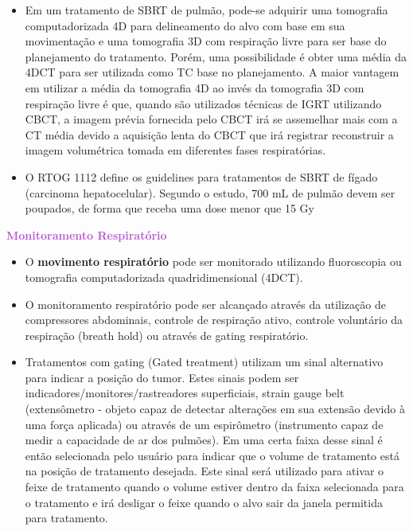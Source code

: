 \documentclass[11pt,a4paper]{article}
\newcounter{exemplo}
\begin{document}
\begin{exemplo}
\begin{itemize}
        \item Em um tratamento de SBRT de pulmão, pode-se adquirir uma tomografia computadorizada 4D para delineamento do alvo com base em sua movimentação e uma tomografia 3D com respiração livre para ser base do planejamento do tratamento. Porém, uma possibilidade é obter uma média da 4DCT para ser utilizada como TC base no planejamento. A maior vantagem em utilizar a média da tomografia 4D ao invés da tomografia 3D com respiração livre é que, quando são utilizados técnicas de IGRT utilizando CBCT, a imagem prévia fornecida pelo CBCT irá se assemelhar mais com a CT média devido a aquisição lenta do CBCT que irá registrar reconstruir a imagem volumétrica tomada em diferentes fases respiratórias.
        
        \item O RTOG 1112 define os guidelines para tratamentos de SBRT de fígado (carcinoma hepatocelular). Segundo o estudo, 700 mL de pulmão devem ser poupados, de forma que receba uma dose menor que 15 Gy

    \end{itemize}

    \textcolor{MediumOrchid}{\LobsterTwo\textbf{Monitoramento Respiratório}}
    \begin{itemize}
        \item O \textbf{movimento respiratório} pode ser monitorado utilizando fluoroscopia ou tomografia computadorizada quadridimensional (4DCT).
        
        \item O monitoramento respiratório pode ser alcançado através da utilização de compressores abdominais, controle de respiração ativo, controle voluntário da respiração (breath hold) ou através de gating respiratório.
        
        \item Tratamentos com gating (Gated treatment) utilizam um sinal alternativo para indicar a posição do tumor. Estes sinais podem ser indicadores/monitores/rastreadores superficiais, strain gauge belt (extensômetro - objeto capaz de detectar alterações em sua extensão devido à uma força aplicada) ou através de um espirômetro (instrumento capaz de medir a capacidade de ar dos pulmões). Em uma certa faixa desse sinal é então selecionada pelo usuário para indicar que o volume de tratamento está na posição de tratamento desejada. Este sinal será utilizado para ativar o feixe de tratamento quando o volume estiver dentro da faixa selecionada para o tratamento e irá desligar o feixe quando o alvo sair da janela permitida para tratamento.
        

\end{itemize}
\end{exemplo}
\end{document}
